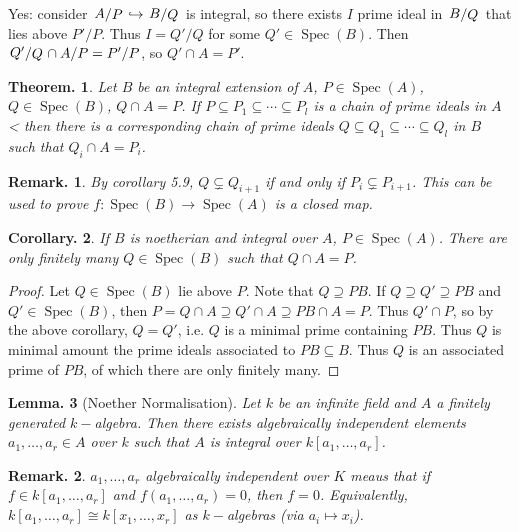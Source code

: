 \documentclass[11pt, a4paper]{memoir}
\newcommand{\hto}[0]{\ensuremath{\hookrightarrow}}
\theoremstyle{change}
\newtheorem{theorem}{Theorem.}[section]
\newtheorem{lemma}[theorem]{Lemma.}
\newtheorem{corollary}[theorem]{Corollary.}
\theoremstyle{plain}
\theoremstyle{nonumberplain}
\newtheorem{remark}{Remark.}
\newtheorem{proof}{Proof}
\DeclareMathOperator{\Spec}{Spec}
\newcommand{\quot}[2]{\mathchoice{\left.\raisebox{0.10em}{$#1$}\middle/\raisebox{-0.10em}{$#2$}\right.}
                                 {\left.\raisebox{0.04em}{$#1$}\middle/\raisebox{-0.04em}{$#2$}\right.}
                                 {\left.\raisebox{0.01em}{$#1$}\middle/\raisebox{-0.01em}{$#2$}\right.}
                                 {\left.\raisebox{0em}{$#1$}\middle/\raisebox{0em}{$#2$}\right.}}
\numberwithin{equation}{section}
\begin{document}
Yes: consider $\quot{A}{P}\hto \quot{B}{Q}$ is integral, so there exists $I$ prime ideal in $\quot{B}{Q}$ that lies above $P'/P$.
Thus $I=Q'/Q$ for some $Q'\in\Spec(B)$.
Then $\quot{Q'}{Q}\cap A/P=P'/P$, so $Q'\cap A=P'$.
\begin{theorem}
    Let $B$ be an integral extension of $A$, $P\in\Spec(A)$, $Q\in\Spec(B)$, $Q\cap A=P$.
    If $P\subseteq P_1\subseteq\cdots\subseteq P_l$ is a chain of prime ideals in $A$< then there is a corresponding chain of prime ideals $Q\subseteq Q_1\subseteq\cdots\subseteq Q_l$ in $B$ such that $Q_i\cap A=P_i$.
\end{theorem}
\begin{remark}
    By corollary 5.9, $Q\subsetneq Q_{i+1}$ if and only if $P_i\subsetneq P_{i+1}$.
    This can be used to prove $f:\Spec(B)\to\Spec(A)$ is a closed map.
\end{remark}
\begin{corollary}
    If $B$ is noetherian and integral over $A$, $P\in\Spec(A)$.
    There are only finitely many $Q\in\Spec(B)$ such that $Q\cap A=P$.
\end{corollary}
\begin{proof}
    Let $Q\in\Spec(B)$ lie above $P$.
    Note that $Q\supseteq PB$.
    If $Q\supseteq Q'\supseteq PB$ and $Q'\in\Spec(B)$, then $P=Q\cap A\supseteq Q'\cap A\supseteq PB\cap A=P$.
    Thus $Q'\cap P$, so by the above corollary, $Q=Q'$, i.e. $Q$ is a minimal prime containing $PB$.
    Thus $Q$ is minimal amount the prime ideals associated to $PB\subseteq B$.
    Thus $Q$ is an associated prime of $PB$, of which there are only finitely many.
\end{proof}
\begin{lemma}[Noether Normalisation]
    Let $k$ be an infinite field and $A$ a finitely generated $k-$algebra.
    Then there exists algebraically independent elements $a_1,\ldots,a_r\in A$ over $k$ such that $A$ is integral over $k[a_1,\ldots,a_r]$.
\end{lemma}
\begin{remark}
    $a_1,\ldots,a_r$ algebraically independent over $K$ meaus that if $f\in k[a_1,\ldots,a_r]$ and $f(a_1,\ldots,a_r)=0$, then $f=0$.
    Equivalently, $k[a_1,\ldots,a_r]\cong k[x_1,\ldots,x_r]$ as $k-$algebras (via $a_i\mapsto x_i$).
\end{remark}
\end{document}
